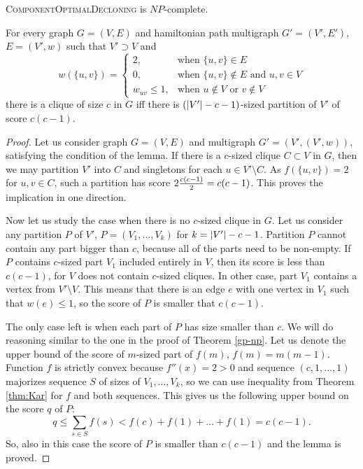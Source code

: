 \begin{thm} \label{ultimate-theorem}
\textsc{ComponentOptimalDecloning} is $NP$-complete.
\end{thm}

\begin{lmm} \label{hpmd-red}
For every graph $G=(V,E)$ and hamiltonian path multigraph $G'=(V',E')$, $E=(V',w)$ such that $V' \supset V$ and
$$ w(\{u,v\}) =
\begin{cases}
2, 				&\text{when } \{u,v\} \in E \\
0, 				&\text{when } \{u,v\} \not\in E \text{ and } u,v \in V \\
w_{u v}\leq 1,	&\text{when } u \not\in V \text{ or } v \not\in V
\end{cases}
$$
there is a clique of size $c$ in $G$ iff
there is $\left(\left\vert V' \right\vert-c-1\right)$-sized partition of $V'$ of score $c(c-1)$.
\end{lmm}

\begin{proof} \label{hpmp-red-2}
Let us consider graph $G=(V,E)$ and multigraph $G'=(V',(V',w))$, satisfying the condition of the lemma.
If there is a $c$-sized clique $C \subset V$ in $G$,
then we may partition $V'$ into $C$ and singletons for each $u \in V' \setminus C$.
As $f(\{u,v\})=2$ for $u,v \in C$, such a partition has score $2 {c(c-1) \over 2} = c(c-1)$.
This proves the implication in one direction.

Now let us study the case when there is no $c$-sized clique in $G$.
Let us consider any partition $P$ of $V'$, $P=(V_1, ..., V_k)$ for $k = \left\vert V' \right\vert-c-1$.
Partition $P$ cannot contain any part bigger than $c$,
because all of the parts need to be non-empty.
If $P$ contains $c$-sized part $V_1$ included entirely in $V$, then its score is less than $c(c-1)$,
for $V$ does not contain $c$-sized cliques.
In other case, part $V_1$ contains a vertex from $V' \setminus V$.
This means that there is an edge $e$ with one vertex in $V_1$ such that $w(e) \leq 1$,
so the score of $P$ is smaller that $c(c-1)$.

The only case left is when each part of $P$ has size smaller than $c$.
We will do reasoning similar to the one in the proof of Theorem \ref{gp-np}.
Let us denote the upper bound of the score of $m$-sized part of $f(m)$, $f(m) = m(m-1)$.
Function $f$ is strictly convex because $f''(x) = 2 > 0$
and sequence $(c,1,...,1)$ majorizes sequence $S$ of sizes of $V_1, ..., V_k$,
so we can use inequality from Theorem \ref{thm:Kar}
for $f$ and both sequences.
This gives us the following upper bound on the score $q$ of $P$:
$$q \leq \sum_{s \in S} f(s) < f(c) + f(1) + ... + f(1) = c(c-1) \text{.}$$
So, also in this case the score of $P$ is smaller than $c(c-1)$ and the lemma is proved.
\end{proof}

